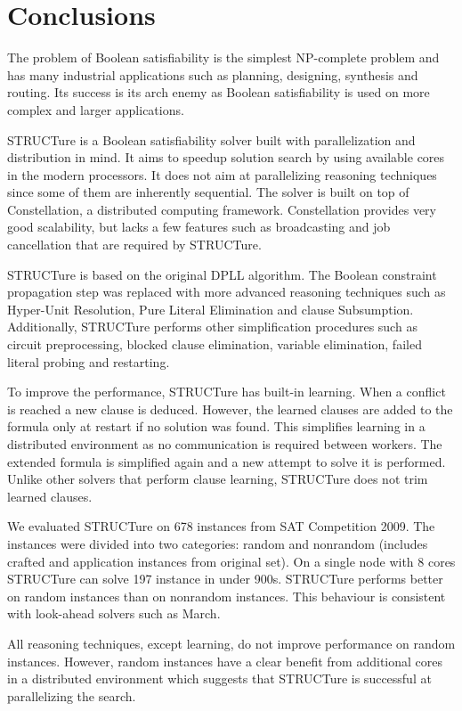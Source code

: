 \chapter{Conclusions}
\label{chap:conclusions}

The problem of Boolean satisfiability is the simplest NP-complete
problem and has many industrial applications such as planning,
designing, synthesis and routing. Its success is its arch enemy
as Boolean satisfiability is used on more complex and larger
applications.

STRUCTure is a Boolean satisfiability solver built with
parallelization and distribution in mind. It aims to speedup solution
search by using available cores in the modern processors. It does not
aim at parallelizing reasoning techniques since some of them are
inherently sequential. The solver is built on top of Constellation,
a distributed computing framework. Constellation provides very good
scalability, but lacks a few features such as broadcasting and job
cancellation that are required by STRUCTure.

STRUCTure is based on the original DPLL algorithm. The Boolean
constraint propagation step was replaced with more advanced reasoning
techniques such as Hyper-Unit Resolution, Pure Literal Elimination
and clause Subsumption.  Additionally, STRUCTure performs other
simplification procedures such as circuit preprocessing, blocked
clause elimination, variable elimination, failed literal probing
and restarting.

To improve the performance, STRUCTure has built-in learning.  When a
conflict is reached a new clause is deduced. However, the learned
clauses are added to the formula only at restart if no solution was
found. This simplifies learning in a distributed environment as no
communication is required between workers.  The extended formula is
simplified again and a new attempt to solve it is performed. Unlike
other solvers that perform clause learning, STRUCTure does not trim
learned clauses.

We evaluated STRUCTure on 678 instances from SAT Competition 2009.
The instances were divided into two categories: random and nonrandom
(includes crafted and application instances from original set).
On a single node with 8 cores STRUCTure can solve 197 instance
in under 900s.  STRUCTure performs better on random instances than
on nonrandom instances. This behaviour is consistent with look-ahead
solvers such as March.

All reasoning techniques, except learning, do not improve performance
on random instances. However, random instances have a clear benefit
from additional cores in a distributed environment which suggests
that STRUCTure is successful at parallelizing the search.

